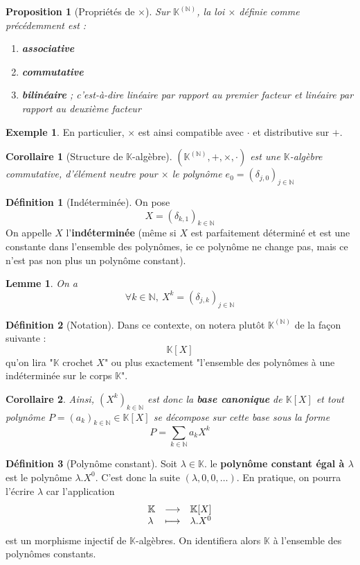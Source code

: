 \documentclass[french]{book}
\newcommand{\N}{\mathbb{N}}
\newcommand{\K}{\mathbb{K}}
\theoremstyle{plain}
\newtheorem{lem}{Lemme}[chapter]
\newtheorem{prop}{Proposition}[chapter]
\newtheorem{cor}{Corollaire}[chapter]
\theoremstyle{definition}
\newtheorem{dfn}{Définition}[chapter]
\newtheorem{exa}{Exemple}[chapter]
\theoremstyle{remark}
\begin{document}
\begin{prop}[Propriétés de $\times$]
	Sur $\K^{(\N)}$, la loi $\times$ définie comme précédemment est :
	\begin{enumerate}
		\item \textbf{associative}
		\item \textbf{commutative}
		\item \textbf{bilinéaire} ; c'est-à-dire linéaire par rapport au premier facteur et linéaire par rapport au deuxième facteur
	\end{enumerate}
\end{prop}
\begin{exa}
	En particulier, $\times$ est ainsi compatible avec $\cdot$ et distributive sur $+$.
\end{exa}
\begin{cor}[Structure de $\K$-algèbre]
	$(\K^{(\N)},+,\times,\cdot)$ est une $\K$-algèbre commutative, d'élément neutre pour $\times$ le polynôme $e_0=(\delta_{j,0})_{j\in\N}$
\end{cor}
\begin{dfn}[Indéterminée]
	On pose $$X=(\delta_{k,1})_{k\in\N}$$ On appelle $X$ l'\textbf{indéterminée} (même si $X$ est parfaitement déterminé et est une constante dans l'ensemble des polynômes, ie ce polynôme ne change pas, mais ce n'est pas non plus un polynôme constant).
\end{dfn}
\begin{lem}
	On a $$\forall k\in\N,\ X^k=(\delta_{j,k})_{j\in\N}$$
\end{lem}
\begin{dfn}[Notation]
	Dans ce contexte, on notera plutôt $\K^{(\N)}$ de la façon suivante : $$\K[X]$$ qu'on lira "$\K$ crochet $X$" ou plus exactement "l'ensemble des polynômes à une indéterminée sur le corps $\K$".
\end{dfn}
\begin{cor}
	Ainsi, $(X^k)_{k\in\N}$ est donc la \textbf{base canonique} de $\K[X]$ et tout polynôme $P=(a_k)_{k\in\N}\in\K[X]$ se décompose sur cette base sous la forme $$P=\sum_{k\in\N}a_kX^k$$
\end{cor}
\begin{dfn}[Polynôme constant]
	Soit $\lambda\in\K$. le \textbf{polynôme constant égal à $\lambda$} est le polynôme $\lambda.X^0$. C'est donc la suite $(\lambda,0,0,\ldots)$. En pratique, on pourra l'écrire $\lambda$ car l'application
	$$\begin{array}[t]{lrcl}
		\K & \longrightarrow & \K[X] \\
		 \lambda & \longmapsto & \lambda.X^0
	\end{array}$$ est un morphisme injectif de $\K$-algèbres. On identifiera alors $\K$ à l'ensemble des polynômes constants.
\end{dfn}
\end{document}
